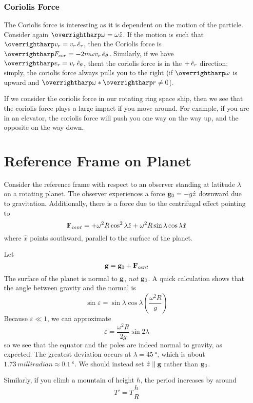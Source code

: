 \subsubsection{Coriolis Force}
The Coriolis force is interesting as it is dependent on the motion of the particle. Consider again \(\vv\omega = \omega \hat z\). If the motion is such that \(\vv v_r = v_r \e r\), then the Coriolis force is \(\vv F_{cor} = - 2 m \omega v_r \e\theta\). Similarly, if we have \(\vv v_r = v_r\e\theta\), thent the coriolis force is in the \(+\,\hat{e}_{r}\) direction; simply, the coriolis force always pulls you to the right (if \(\vv \omega\) is upward and \(\vv \omega * \vv r \neq 0\)). 

If we consider the coriolis force in our rotating ring space ship, then we see that the coriolis force plays a large impact if you move around. For example, if you are in an elevator, the coriolis force will push you one way on the way up, and the opposite on the way down. 

\section{Reference Frame on Planet}
Consider the reference frame with respect to an observer standing at latitude \(\lambda\) on a rotating planet. The observer experiences a force \(\mathbf{g}_0 = -g\hat z\) downward due to gravitation. Additionally, there is a force due to the centrifugal effect pointing to
\[\mathbf{F}_{cent} = +\omega^2R\cos^2\lambda\hat z + \omega^2R\sin\lambda\cos\lambda \hat x\]
where \(\hat x\) points southward, parallel to the surface of the planet.

Let 
\[\mathbf{g} = \mathbf{g}_0 + \mathbf{F}_{cent}\]
The surface of the planet is normal to \(\mathbf{g}\), \emph{not} \(\mathbf{g}_0\). A quick calculation shows that the angle between gravity and the normal is 
\[\sin\varepsilon = \sin\lambda\cos\lambda \left(\frac{\omega^2 R}{g}\right)\]
Because \(\varepsilon\ll 1\), we can approximate
\[\varepsilon = \frac{\omega^2R}{2g}\sin2\lambda\]
so we see that the equator and the poles are indeed normal to gravity, as expected. The greatest deviation occurs at \(\lambda = \SI{45}{\degree}\), which is about \(\SI{1.73}{milliradian}\approx \SI{0.1}{\degree}\). 
We should instead set \(\hat z\parallel \mathbf{g}\) rather than \(\mathbf{g}_0\).

Similarly, if you climb a mountain of height \(h\), the period increases by around
\[T' = T\frac{h}{R}\]

